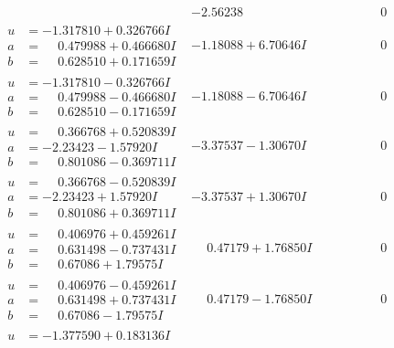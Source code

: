 \documentclass[1p]{elsarticle_modified}
\theoremstyle{definition}
\begin{document}
$$\begin{array}{c|c|c}
 & -2.56238\phantom{ +0.000000I} & \phantom{-0.000000 } 0 \\ \hline\begin{aligned}
u &= -1.317810 + 0.326766 I \\
a &= \phantom{-}0.479988 + 0.466680 I \\
b &= \phantom{-}0.628510 + 0.171659 I\end{aligned}
 & -1.18088 + 6.70646 I & \phantom{-0.000000 } 0 \\ \hline\begin{aligned}
u &= -1.317810 - 0.326766 I \\
a &= \phantom{-}0.479988 - 0.466680 I \\
b &= \phantom{-}0.628510 - 0.171659 I\end{aligned}
 & -1.18088 - 6.70646 I & \phantom{-0.000000 } 0 \\ \hline\begin{aligned}
u &= \phantom{-}0.366768 + 0.520839 I \\
a &= -2.23423 - 1.57920 I \\
b &= \phantom{-}0.801086 - 0.369711 I\end{aligned}
 & -3.37537 - 1.30670 I & \phantom{-0.000000 } 0 \\ \hline\begin{aligned}
u &= \phantom{-}0.366768 - 0.520839 I \\
a &= -2.23423 + 1.57920 I \\
b &= \phantom{-}0.801086 + 0.369711 I\end{aligned}
 & -3.37537 + 1.30670 I & \phantom{-0.000000 } 0 \\ \hline\begin{aligned}
u &= \phantom{-}0.406976 + 0.459261 I \\
a &= \phantom{-}0.631498 - 0.737431 I \\
b &= \phantom{-}0.67086 + 1.79575 I\end{aligned}
 & \phantom{-}0.47179 + 1.76850 I & \phantom{-0.000000 } 0 \\ \hline\begin{aligned}
u &= \phantom{-}0.406976 - 0.459261 I \\
a &= \phantom{-}0.631498 + 0.737431 I \\
b &= \phantom{-}0.67086 - 1.79575 I\end{aligned}
 & \phantom{-}0.47179 - 1.76850 I & \phantom{-0.000000 } 0 \\ \hline\begin{aligned}
u &= -1.377590 + 0.183136 I \\

\end{aligned}
\end{array}$$
\end{document}

